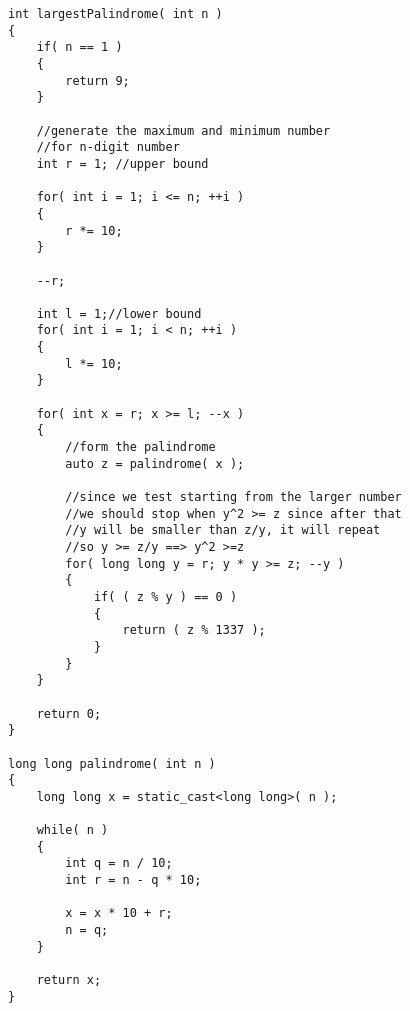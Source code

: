 \setcounter{lstlisting}{0}
\begin{lstlisting}[style=customc, caption={Try All From Largest}]
int largestPalindrome( int n )
{
    if( n == 1 )
    {
        return 9;
    }

    //generate the maximum and minimum number
    //for n-digit number
    int r = 1; //upper bound

    for( int i = 1; i <= n; ++i )
    {
        r *= 10;
    }

    --r;

    int l = 1;//lower bound
    for( int i = 1; i < n; ++i )
    {
        l *= 10;
    }

    for( int x = r; x >= l; --x )
    {
        //form the palindrome
        auto z = palindrome( x );

        //since we test starting from the larger number
        //we should stop when y^2 >= z since after that
        //y will be smaller than z/y, it will repeat
        //so y >= z/y ==> y^2 >=z
        for( long long y = r; y * y >= z; --y )
        {
            if( ( z % y ) == 0 )
            {
                return ( z % 1337 );
            }
        }
    }

    return 0;
}

long long palindrome( int n )
{
    long long x = static_cast<long long>( n );

    while( n )
    {
        int q = n / 10;
        int r = n - q * 10;

        x = x * 10 + r;
        n = q;
    }

    return x;
}
\end{lstlisting}